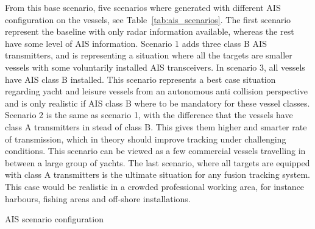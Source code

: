 From this base scenario, five scenarios where generated with different AIS configuration on the vessels, see Table~\ref{tab:ais_scenarios}. The first scenario represent the baseline with only radar information available, whereas the rest have some level of AIS information. Scenario 1 adds three class B AIS transmitters, and is representing a situation where all the targets are smaller vessels with some voluntarily installed AIS transceivers. In scenario 3, all vessels have AIS class B installed. This scenario represents a best case situation regarding yacht and leisure vessels from an autonomous anti collision perspective and is only realistic if AIS class B where to be mandatory for these vessel classes. Scenario 2 is the same as scenario 1, with the difference that the vessels have class A transmitters in stead of class B. This gives them higher and smarter rate of transmission, which in theory should improve tracking under challenging conditions. This scenario can be viewed as a few commercial vessels travelling in between a large group of yachts. The last scenario, where all targets are equipped with class A transmitters is the ultimate situation for any fusion tracking system. This case would be realistic in a crowded professional working area, for instance harbours, fishing areas and off-shore installations.
\begin{table}
\centering
{}
\caption{AIS scenario configuration}\label{tab:ais_scenarios}
\end{table}

